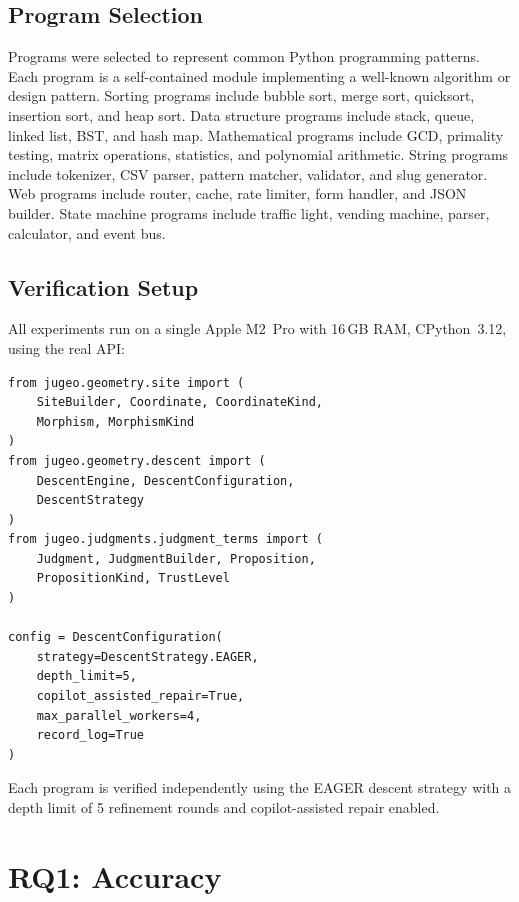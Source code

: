 \documentclass[11pt]{article}
\begin{document}
\subsection{Program Selection}

Programs were selected to represent common Python programming
patterns.  Each program is a self-contained module implementing a
well-known algorithm or design pattern.  Sorting programs include
bubble sort, merge sort, quicksort, insertion sort, and heap sort.
Data structure programs include stack, queue, linked list, BST, and
hash map.  Mathematical programs include GCD, primality testing,
matrix operations, statistics, and polynomial arithmetic.  String
programs include tokenizer, CSV parser, pattern matcher, validator,
and slug generator.  Web programs include router, cache, rate limiter,
form handler, and JSON builder.  State machine programs include
traffic light, vending machine, parser, calculator, and event bus.

\subsection{Verification Setup}

All experiments run on a single Apple M2~Pro with 16\,GB RAM,
CPython~3.12, using the real \JuGeo{} API:

\begin{lstlisting}[style=jugeo-python,caption={Verification setup.}]
from jugeo.geometry.site import (
    SiteBuilder, Coordinate, CoordinateKind,
    Morphism, MorphismKind
)
from jugeo.geometry.descent import (
    DescentEngine, DescentConfiguration,
    DescentStrategy
)
from jugeo.judgments.judgment_terms import (
    Judgment, JudgmentBuilder, Proposition,
    PropositionKind, TrustLevel
)

config = DescentConfiguration(
    strategy=DescentStrategy.EAGER,
    depth_limit=5,
    copilot_assisted_repair=True,
    max_parallel_workers=4,
    record_log=True
)
\end{lstlisting}

Each program is verified independently using the EAGER descent
strategy with a depth limit of 5 refinement rounds and
copilot-assisted repair enabled.

\section{RQ1: Accuracy}\label{sec:rq1}
\end{document}
